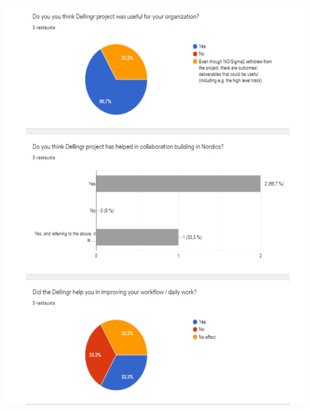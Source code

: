 \documentclass{article}
\begin{document}
\begin{appendices}
\begin{center}
\includegraphics[scale=0.7]{SG_responses_1.pdf}
\end{center}


\end{appendices}
\end{document}

